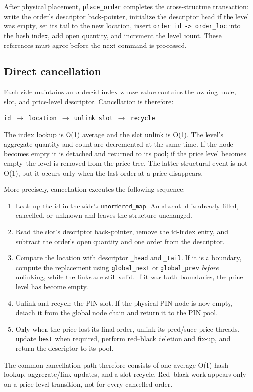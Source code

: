\documentclass[10pt,twocolumn]{article}
\begin{document}
After physical placement, \texttt{place\_order} completes the cross-structure
transaction: write the order's descriptor back-pointer, initialize the
descriptor head if the level was empty, set its tail to the new location, insert
\texttt{order id -> order\_loc} into the hash index, add open quantity, and
increment the level count.  These references must agree before the next command
is processed.

\subsection{Direct cancellation}

Each side maintains an order-id index whose value contains the owning node,
slot, and price-level descriptor.  Cancellation is therefore:

\begin{center}
\texttt{id $\rightarrow$ location $\rightarrow$ unlink slot $\rightarrow$ recycle}
\end{center}

The index lookup is O(1) average and the slot unlink is O(1).  The level's
aggregate quantity and count are decremented at the same time.  If the node
becomes empty it is detached and returned to its pool; if the price level
becomes empty, the level is removed from the price tree.  The latter structural
event is not O(1), but it occurs only when the last order at a price disappears.

More precisely, cancellation executes the following sequence:
\begin{enumerate}
  \item Look up the id in the side's \texttt{unordered\_map}.  An absent id is
        already filled, cancelled, or unknown and leaves the structure unchanged.
  \item Read the slot's descriptor back-pointer, remove the id-index entry, and
        subtract the order's open quantity and one order from the descriptor.
  \item Compare the location with descriptor \texttt{\_head} and
        \texttt{\_tail}.  If it is a boundary, compute the replacement using
        \texttt{global\_next} or \texttt{global\_prev} \emph{before} unlinking,
        while the links are still valid.  If it was both boundaries, the price
        level has become empty.
  \item Unlink and recycle the PIN slot.  If the physical PIN node is now empty,
        detach it from the global node chain and return it to the PIN pool.
  \item Only when the price lost its final order, unlink its pred/succ price
        threads, update \texttt{best} when required, perform red--black deletion
        and fix-up, and return the descriptor to its pool.
\end{enumerate}
The common cancellation path therefore consists of one average-O(1) hash lookup,
aggregate/link updates, and a slot recycle.  Red--black work appears only on a
price-level transition, not for every cancelled order.
\end{document}
